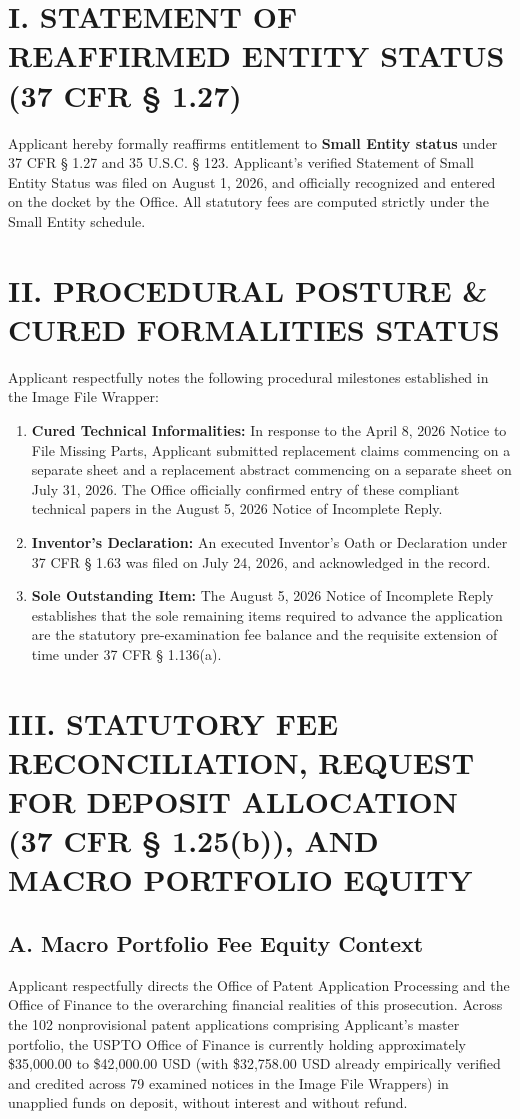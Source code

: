 \documentclass[11pt,letterpaper]{article}
\begin{document}
\section*{I. STATEMENT OF REAFFIRMED ENTITY STATUS (37 CFR \S{} 1.27)}

Applicant hereby formally reaffirms entitlement to \textbf{Small Entity status} under 37 CFR \S{} 1.27 and 35 U.S.C. \S{} 123. Applicant's verified Statement of Small Entity Status was filed on August 1, 2026, and officially recognized and entered on the docket by the Office. All statutory fees are computed strictly under the Small Entity schedule.

\section*{II. PROCEDURAL POSTURE \& CURED FORMALITIES STATUS}

Applicant respectfully notes the following procedural milestones established in the Image File Wrapper:
\begin{enumerate}[leftmargin=*]
    \item \textbf{Cured Technical Informalities:} In response to the April 8, 2026 Notice to File Missing Parts, Applicant submitted replacement claims commencing on a separate sheet and a replacement abstract commencing on a separate sheet on July 31, 2026. The Office officially confirmed entry of these compliant technical papers in the August 5, 2026 Notice of Incomplete Reply.
    \item \textbf{Inventor's Declaration:} An executed Inventor's Oath or Declaration under 37 CFR \S{} 1.63 was filed on July 24, 2026, and acknowledged in the record.
    \item \textbf{Sole Outstanding Item:} The August 5, 2026 Notice of Incomplete Reply establishes that the sole remaining items required to advance the application are the statutory pre-examination fee balance and the requisite extension of time under 37 CFR \S{} 1.136(a).
\end{enumerate}

\section*{III. STATUTORY FEE RECONCILIATION, REQUEST FOR DEPOSIT ALLOCATION (37 CFR \S{} 1.25(b)), AND MACRO PORTFOLIO EQUITY}

\subsection*{A. Macro Portfolio Fee Equity Context}
Applicant respectfully directs the Office of Patent Application Processing and the Office of Finance to the overarching financial realities of this prosecution. Across the 102 nonprovisional patent applications comprising Applicant's master portfolio, the USPTO Office of Finance is currently holding approximately \$35,000.00 to \$42,000.00 USD (with \$32,758.00 USD already empirically verified and credited across 79 examined notices in the Image File Wrappers) in unapplied funds on deposit, without interest and without refund.
\end{document}
